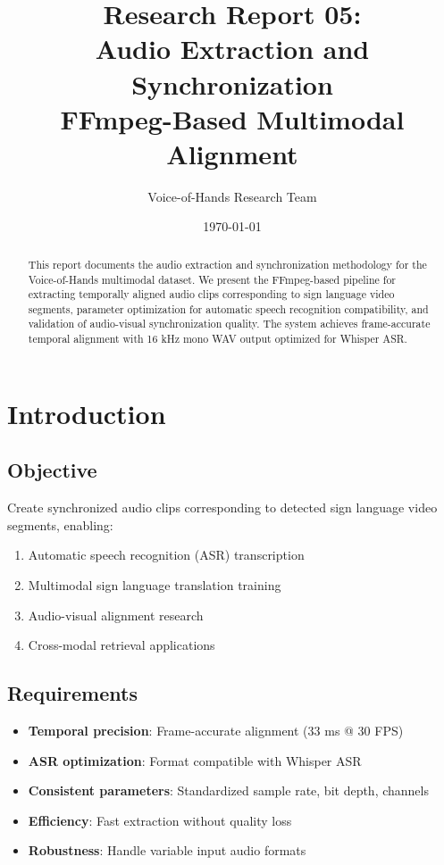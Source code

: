 \documentclass[11pt,a4paper]{article}
\title{\textbf{Research Report 05:}\\Audio Extraction and Synchronization\\FFmpeg-Based Multimodal Alignment}
\author{Voice-of-Hands Research Team}
\date{\today}
\begin{document}
\maketitle

\begin{abstract}
This report documents the audio extraction and synchronization methodology for the Voice-of-Hands multimodal dataset. We present the FFmpeg-based pipeline for extracting temporally aligned audio clips corresponding to sign language video segments, parameter optimization for automatic speech recognition compatibility, and validation of audio-visual synchronization quality. The system achieves frame-accurate temporal alignment with 16 kHz mono WAV output optimized for Whisper ASR.
\end{abstract}

\tableofcontents
\newpage

\section{Introduction}

\subsection{Objective}

Create synchronized audio clips corresponding to detected sign language video segments, enabling:
\begin{enumerate}
    \item Automatic speech recognition (ASR) transcription
    \item Multimodal sign language translation training
    \item Audio-visual alignment research
    \item Cross-modal retrieval applications
\end{enumerate}

\subsection{Requirements}

\begin{itemize}
    \item \textbf{Temporal precision}: Frame-accurate alignment (33 ms @ 30 FPS)
    \item \textbf{ASR optimization}: Format compatible with Whisper ASR
    \item \textbf{Consistent parameters}: Standardized sample rate, bit depth, channels
    \item \textbf{Efficiency}: Fast extraction without quality loss
    \item \textbf{Robustness}: Handle variable input audio formats
\end{itemize}
\end{document}
